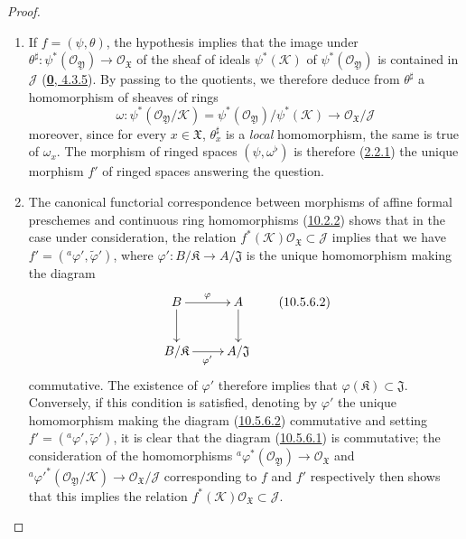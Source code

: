 \begin{proof}
\medskip\noindent
\begin{enumerate}
  \item[\rm{(i)}] If $f=(\psi,\theta)$, the hypothesis implies that
    the image under
    $\theta^\sharp:\psi^*(\mathscr{O}_{\mathfrak{Y}})\to
    \mathscr{O}_{\mathfrak{X}}$ of the sheaf of ideals
    $\psi^*(\mathscr{K})$ of $\psi^*(\mathscr{O}_{\mathfrak{Y}})$ is
    contained in $\mathscr{J}$
    (\hyperref[0.4.3.5]{\textbf{0}, 4.3.5}). By passing to the quotients, we
    therefore deduce from $\theta^\sharp$ a homomorphism of sheaves of rings
    \[
      \omega:\psi^*(\mathscr{O}_{\mathfrak{Y}}/\mathscr{K})
      =\psi^*(\mathscr{O}_{\mathfrak{Y}})/\psi^*(\mathscr{K})
      \to\mathscr{O}_{\mathfrak{X}}/\mathscr{J}
    \]
    moreover, since for every $x\in\mathfrak{X}$,
    $\theta_x^\sharp$ is a \emph{local} homomorphism, the same is true
    of $\omega_x$. The morphism of ringed spaces
    $(\psi,\omega^\flat)$ is therefore
    (\hyperref[I.2.2.1]{2.2.1}) the unique morphism $f'$ of ringed
    spaces answering the question.
  \item[\rm{(ii)}] The canonical functorial correspondence between
    morphisms of affine formal preschemes and continuous ring
    homomorphisms (\hyperref[I.10.2.2]{10.2.2}) shows that in the case
    under consideration, the relation
    $f^*(\mathscr{K})\mathscr{O}_{\mathfrak{X}}\subset\mathscr{J}$
    implies that we have
    $f'=({}^a\varphi',\widetilde{\varphi}')$, where
    $\varphi':B/\mathfrak{K}\to A/\mathfrak{J}$ is the unique
    homomorphism making the diagram
    \[
      \label{I.10.5.6.2}
      \xymatrix{
        B\ar[r]^\varphi\ar[d] & A\ar[d]\\
        B/\mathfrak{K}\ar[r]_{\varphi'} & A/\mathfrak{J}
      }
      \tag{10.5.6.2}
    \]
    commutative. The existence of $\varphi'$ therefore implies that
    $\varphi(\mathfrak{K})\subset\mathfrak{J}$. Conversely, if this
    condition is satisfied, denoting by $\varphi'$ the unique
    homomorphism making the diagram
    (\hyperref[I.10.5.6.2]{10.5.6.2}) commutative and setting
    $f'=({}^a\varphi',\widetilde{\varphi}')$, it is clear that the
    diagram (\hyperref[I.10.5.6.1]{10.5.6.1}) is commutative; the
    consideration of the homomorphisms
    ${}^a\varphi^*(\mathscr{O}_{\mathfrak{Y}})\to
    \mathscr{O}_{\mathfrak{X}}$ and
    ${}^a{\varphi'}^*(\mathscr{O}_{\mathfrak{Y}}/\mathscr{K})\to
    \mathscr{O}_{\mathfrak{X}}/\mathscr{J}$ corresponding to $f$ and
    $f'$ respectively then shows that this implies the relation
    $f^*(\mathscr{K})\mathscr{O}_{\mathfrak{X}}\subset\mathscr{J}$.
\end{enumerate}
\end{proof}

